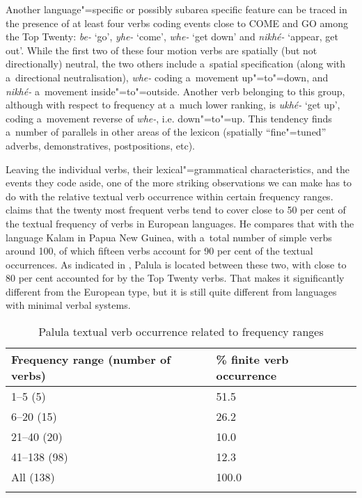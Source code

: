 Another language"=specific or possibly subarea specific feature can be traced in the presence of at least four verbs coding events close to COME and GO among the Top Twenty: \textit{be-} `go', \textit{yhe-} `come', \textit{whe-} `get down' and \textit{nikhé-} `appear, get out'. While the first two of these four motion verbs are spatially (but not directionally) neutral, the two others include a~spatial specification (along with a~directional neutralisation), \textit{whe-} coding a~movement up"=to"=down, and \textit{nikhé-} a~movement inside"=to"=outside. Another verb belonging to this group, although with respect to frequency at a~much lower ranking, is \textit{ukhé-} `get up', coding a~movement reverse of \textit{whe-}, i.e. down"=to"=up. This tendency finds a~number of parallels in other areas of the lexicon (spatially ``fine"=tuned'' adverbs, demonstratives, postpositions, etc).



Leaving the individual verbs, their lexical"=grammatical characteristics, and the events they code aside, one of the more striking observations we can make has to do with the relative textual verb occurrence within certain frequency ranges. \citet[409]{viberg2006} claims that the twenty most frequent verbs tend to cover close to 50 per cent of the textual frequency of verbs in European languages. He compares that with the language Kalam in Papua New Guinea, with a~total number of simple verbs around 100, of which fifteen verbs account for 90 per cent of the textual occurrences. As indicated in , Palula is located between these two, with close to 80 per cent accounted for by the Top Twenty verbs. That makes it significantly different from the European type, but it is still quite different from languages with minimal verbal systems. 


\begin{table}[ht]
\caption{Palula textual verb occurrence related to frequency ranges}

\begin{tabularx}{\textwidth}{ Q P{50mm} }
\lsptoprule
Frequency range (number of verbs) &
\% finite verb occurrence\\--5 (5) &
\phantom{1}51.5\\
6--20 (15) &
\phantom{1}26.2\\
21--40 (20) &
\phantom{1}10.0\\
41--138 (98) &
\phantom{1}12.3\\
All (138) &
100.0\\\lspbottomrule
\end{tabularx}
\label{tab:8-2}
\end{table}


